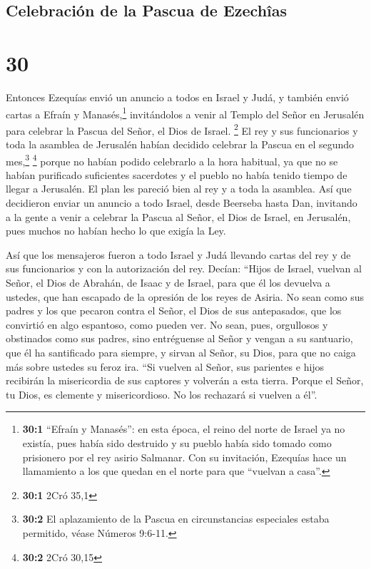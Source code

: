 \hypertarget{celebraciuxf3n-de-la-pascua-de-ezechuxeeas}{%
\subsection{Celebración de la Pascua de
Ezechîas}\label{celebraciuxf3n-de-la-pascua-de-ezechuxeeas}}

\hypertarget{section-29}{%
\section{30}\label{section-29}}

 Entonces Ezequías envió un anuncio a todos en Israel y
Judá, y también envió cartas a Efraín y Manasés,\footnote{\textbf{30:1}
  ``Efraín y Manasés'': en esta época, el reino del norte de Israel ya
  no existía, pues había sido destruido y su pueblo había sido tomado
  como prisionero por el rey asirio Salmanar. Con su invitación,
  Ezequías hace un llamamiento a los que quedan en el norte para que
  ``vuelvan a casa''.} invitándolos a venir al Templo del Señor en
Jerusalén para celebrar la Pascua del Señor, el Dios de Israel.
\footnote{\textbf{30:1} 2Cró 35,1}  El rey y sus
funcionarios y toda la asamblea de Jerusalén habían decidido celebrar la
Pascua en el segundo mes,\footnote{\textbf{30:2} El aplazamiento de la
  Pascua en circunstancias especiales estaba permitido, véase Números
  9:6-11.} \footnote{\textbf{30:2} 2Cró 30,15}  porque no
habían podido celebrarlo a la hora habitual, ya que no se habían
purificado suficientes sacerdotes y el pueblo no había tenido tiempo de
llegar a Jerusalén.  El plan les pareció bien al rey y a
toda la asamblea.  Así que decidieron enviar un anuncio a
todo Israel, desde Beerseba hasta Dan, invitando a la gente a venir a
celebrar la Pascua al Señor, el Dios de Israel, en Jerusalén, pues
muchos no habían hecho lo que exigía la Ley.

 Así que los mensajeros fueron a todo Israel y Judá
llevando cartas del rey y de sus funcionarios y con la autorización del
rey. Decían: ``Hijos de Israel, vuelvan al Señor, el Dios de Abrahán, de
Isaac y de Israel, para que él los devuelva a ustedes, que han escapado
de la opresión de los reyes de Asiria.  No sean como sus
padres y los que pecaron contra el Señor, el Dios de sus antepasados,
que los convirtió en algo espantoso, como pueden ver.  No
sean, pues, orgullosos y obstinados como sus padres, sino entréguense al
Señor y vengan a su santuario, que él ha santificado para siempre, y
sirvan al Señor, su Dios, para que no caiga más sobre ustedes su feroz
ira.  ``Si vuelven al Señor, sus parientes e hijos
recibirán la misericordia de sus captores y volverán a esta tierra.
Porque el Señor, tu Dios, es clemente y misericordioso. No los rechazará
si vuelven a él''.

